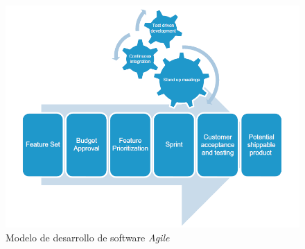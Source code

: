 \documentclass[12pt,twoside]{book}
\begin{document}
\begin{figure}
	\centering
	\includegraphics[width=0.9\linewidth]{agile.png}
	\caption{Modelo de desarrollo de software \textit{Agile}}
	\label{fig0003}
\end{figure}
\end{document}
